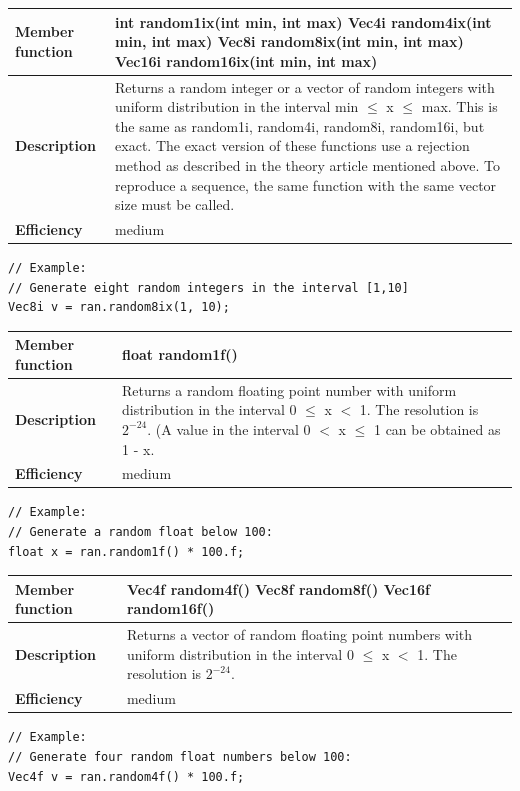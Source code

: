 \documentclass[11pt,a4paper,oneside,openright]{report}
\newcommand{\vspacesmall}{\vspace{3mm}}
\begin{document}
\begin{tabular}{|p{30mm}|p{100mm}|}
\hline
\bfseries Member function & int random1ix(int min, int max) \newline
Vec4i random4ix(int min, int max) \newline
Vec8i random8ix(int min, int max) \newline
Vec16i random16ix(int min, int max) \\ \hline
\bfseries Description & Returns a random integer or a vector of random integers with uniform distribution in the interval min $\leq$ x $\leq$ max. \newline
This is the same as random1i, random4i, random8i, random16i, but exact. \newline
The exact version of these functions use a rejection method as described in the theory article mentioned above. To reproduce a sequence, the same function with the same vector size must be called. \\ \hline
\bfseries Efficiency & medium \\ \hline
\end{tabular}
\begin{lstlisting}[frame=none]
// Example:
// Generate eight random integers in the interval [1,10]
Vec8i v = ran.random8ix(1, 10);
\end{lstlisting}
\vspacesmall

\begin{tabular}{|p{30mm}|p{100mm}|}
\hline
\bfseries Member function & float random1f() \\ \hline
\bfseries Description & Returns a random floating point number with uniform distribution in the interval 0 $\leq$ x $<$ 1. The resolution is $2^{-24}$. \newline
(A value in the interval 0 $<$ x $\leq$ 1 can be obtained as 1 - x. \\ \hline
\bfseries Efficiency & medium \\ \hline
\end{tabular}
\begin{lstlisting}[frame=none]
// Example:
// Generate a random float below 100:
float x = ran.random1f() * 100.f;
\end{lstlisting}
\vspacesmall

\begin{tabular}{|p{30mm}|p{100mm}|}
\hline
\bfseries Member function & Vec4f random4f() \newline
Vec8f random8f() \newline
Vec16f random16f() \\ \hline
\bfseries Description & Returns a vector of random floating point numbers with uniform distribution in the interval 0 $\leq$ x $<$ 1. The resolution is $2^{-24}$.  \\ \hline
\bfseries Efficiency & medium \\ \hline
\end{tabular}
\begin{lstlisting}[frame=none]
// Example:
// Generate four random float numbers below 100:
Vec4f v = ran.random4f() * 100.f;
\end{lstlisting}
\vspacesmall
\end{document}
